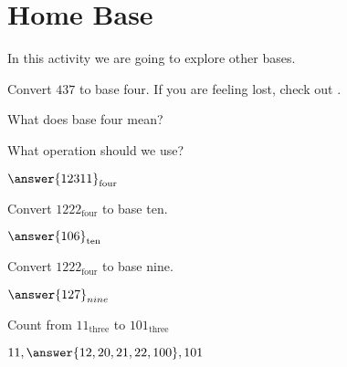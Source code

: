 \documentclass{ximera}
\begin{document}
\section{Home Base}
In this activity we are going to explore other bases. 


\begin{question}
  Convert $437$ to base four. If you are feeling lost, check out
  .
  \begin{solution}
    \begin{hint}
      What does base four mean?
    \end{hint}
    \begin{hint}
      What operation should we use?
    \end{hint}
  $\answer{12311}_{\text{four}}$ %
  \end{solution}
\end{question}

\begin{shuffle}
  \begin{question}
    Convert $1222_{\text{four}}$ to base ten.
    \begin{solution}
      $\answer{106}_{\text{ten}}$ %
    \end{solution}
  \end{question}

  \begin{question}
    Convert $1222_{\text{four}}$ to base nine.
    \begin{solution}
      $\answer{127}_{nine}$ %
    \end{solution}
  \end{question}
\end{shuffle}

\begin{question}
  Count from $11_\text{three}$ to $101_\text{three}$
  \begin{solution}
    $11, \answer{12, 20, 21, 22, 100}, 101$ %
  \end{solution}
\end{question}
\end{document}
